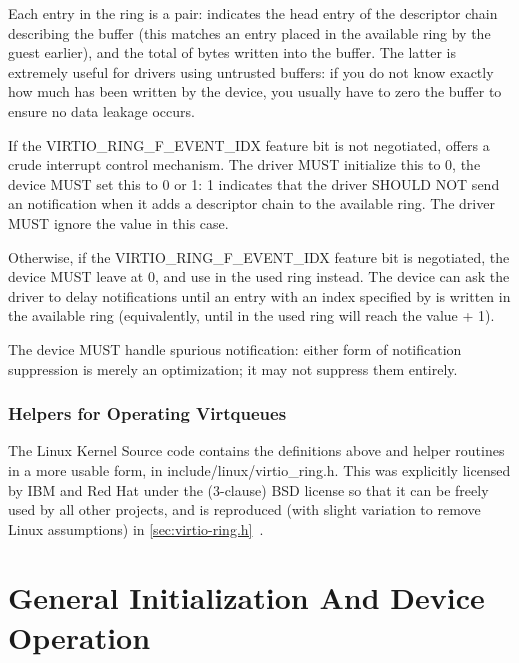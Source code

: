 Each entry in the ring is a pair:  indicates the head entry of the
descriptor chain describing the buffer (this matches an entry
placed in the available ring by the guest earlier), and  the total
of bytes written into the buffer. The latter is extremely useful
for drivers using untrusted buffers: if you do not know exactly
how much has been written by the device, you usually have to zero
the buffer to ensure no data leakage occurs.

If the VIRTIO_RING_F_EVENT_IDX feature bit is not negotiated,
 offers a crude interrupt control mechanism.  The driver
MUST initialize this to 0, the device MUST set this to 0 or 1: 1
indicates that the driver SHOULD NOT send an notification when it adds
a descriptor chain to the available ring.  The driver MUST ignore the
 value in this case.

Otherwise, if the VIRTIO_RING_F_EVENT_IDX feature bit is negotiated,
the device MUST leave  at 0, and use
 in the used ring instead.  The device can ask the
driver to delay notifications until an entry with an index specified
by  is written in the available ring (equivalently,
until  in the used ring will reach the value  +
1).

The device MUST handle spurious notification: either form of
notification suppression is merely an optimization; it may not
suppress them entirely.

\subsection{Helpers for Operating Virtqueues}\label{sec:Basic Facilities of a Virtio Device / Virtqueues / Helpers for Operating Virtqueues}

The Linux Kernel Source code contains the definitions above and
helper routines in a more usable form, in
include/linux/virtio_ring.h. This was explicitly licensed by IBM
and Red Hat under the (3-clause) BSD license so that it can be
freely used by all other projects, and is reproduced (with slight
variation to remove Linux assumptions) in \ref{sec:virtio-ring.h}~.

\chapter{General Initialization And Device Operation}\label{sec:General Initialization And Device Operation}

